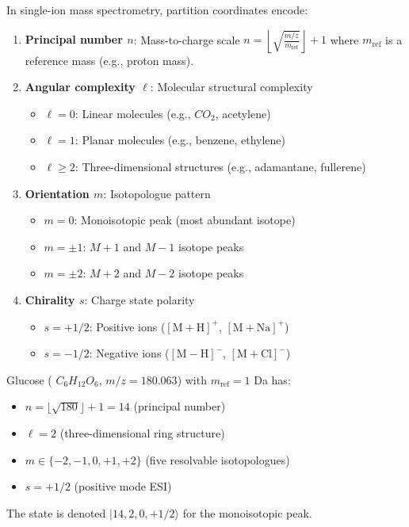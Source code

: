 \begin{proposition}
\label{prop:physical}
In single-ion mass spectrometry, partition coordinates encode:
\begin{enumerate}
    \item \textbf{Principal number $n$}: Mass-to-charge scale
    $
    n = \left\lfloor \sqrt{\frac{m/z}{m_{\mathrm{ref}}}} \right\rfloor + 1
    $
    where $m_{\mathrm{ref}}$ is a reference mass (e.g., proton mass).

    \item \textbf{Angular complexity $\ell$}: Molecular structural complexity
    \begin{itemize}
        \item $\ell = 0$: Linear molecules (e.g., $CO_2$, acetylene)
        \item $\ell = 1$: Planar molecules (e.g., benzene, ethylene)
        \item $\ell \geq 2$: Three-dimensional structures (e.g., adamantane, fullerene)
    \end{itemize}

    \item \textbf{Orientation $m$}: Isotopologue pattern
    \begin{itemize}
        \item $m = 0$: Monoisotopic peak (most abundant isotope)
        \item $m = \pm 1$: $M+1$ and $M-1$ isotope peaks
        \item $m = \pm 2$: $M+2$ and $M-2$ isotope peaks
    \end{itemize}

    \item \textbf{Chirality $s$}: Charge state polarity
    \begin{itemize}
        \item $s = +1/2$: Positive ions ($[\mathrm{M}+\mathrm{H}]^+$, $[\mathrm{M}+\mathrm{Na}]^+$)
        \item $s = -1/2$: Negative ions ($[\mathrm{M}-\mathrm{H}]^-$, $[\mathrm{M}+\mathrm{Cl}]^-$)
    \end{itemize}
\end{enumerate}
\end{proposition}

\begin{example}
\label{ex:glucose}
Glucose ( $C_6H_{12}O_6$, $m/z = 180.063$) with $m_{\mathrm{ref}} = 1$ Da has:
\begin{itemize}
    \item $n = \lfloor \sqrt{180} \rfloor + 1 = 14$ (principal number)
    \item $\ell = 2$ (three-dimensional ring structure)
    \item $m \in \{-2, -1, 0, +1, +2\}$ (five resolvable isotopologues)
    \item $s = +1/2$ (positive mode ESI)
\end{itemize}
The state is denoted $|14, 2, 0, +1/2\rangle$ for the monoisotopic peak.
\end{example}

